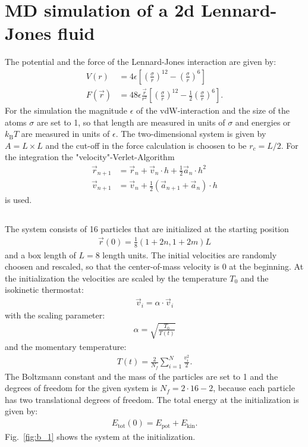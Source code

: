 \section{MD simulation of a 2d Lennard-Jones fluid}
The potential and the force of the Lennard-Jones interaction are given by:
\begin{align}
    V(r) &= 4 \epsilon \left[  \left( \frac{\sigma}{r} \right)^{12}  - \left( \frac{\sigma}{r} \right)^{6} \right] \\
    F(\vec{r} ) &= 48 \epsilon \frac{ \vec{r}}{r^2} \left[  \left( \frac{\sigma}{r} \right)^{12}  - \frac{1}{2}\left( \frac{\sigma}{r} \right)^{6}  \right].
\end{align} 
For the simulation the magnitude $\epsilon$ of the vdW-interaction and the size of the atoms $\sigma$ are set to 1, so that length  are measured in units of $\sigma$ and energies or $k_\text{B}T$ are measured in units of $\epsilon$. The two-dimensional system is given by $A=L \times L$ and the cut-off in the force calculation is choosen to be $r_c = L/2$. For the integration the "velocity"-Verlet-Algorithm
\begin{align}
    \vec{r}_{n+1} &= \vec{r}_n + \vec{v}_n \cdot h + \frac{1}{2} \vec{a}_n \cdot h^2 \\
    \vec{v}_{n+1} &= \vec{v}_n + \frac{1}{2} \left( \vec{a}_{n+1} + \vec{a}_n  \right) \cdot h
\end{align}
is used.
\subsection{}
The system consists of 16 particles that are initialized at the starting position
\begin{align}
    \vec{r}(0) = \frac{1}{8} ( 1 + 2n, 1 + 2m)L
\end{align}
and a box length of $L=8$ length units. The initial velocities are randomly choosen and rescaled, so that the center-of-mass velocity is 0 at the beginning. At the initialization the velocities are scaled by the temperature $T_0$ and the isokinetic thermostat:
\begin{align}
    \vec{v}_i = \alpha \cdot \vec{v}_i
\end{align}
with the scaling parameter:
\begin{align}
    \alpha = \sqrt{\frac{T_0}{T(t)}}
\end{align}
and the momentary temperature:
\begin{align}
    T(t) = \frac{2}{N_f} \sum_{i=1}^{N} \frac{v_i^2}{2}.
\end{align}
The Boltzmann constant and the mass of the particles are set to 1 and the degrees of freedom for the given system is $N_f = 2 \cdot 16 - 2$, because each particle has two translational degrees of freedom. The total energy at the initialization is given by:
\begin{align}
    E_{\text{tot}}(0) = E_{\text{pot}} + E_{\text{kin}}.
\end{align}
Fig.~\ref{fig:b_1} shows the system at the initialization.

